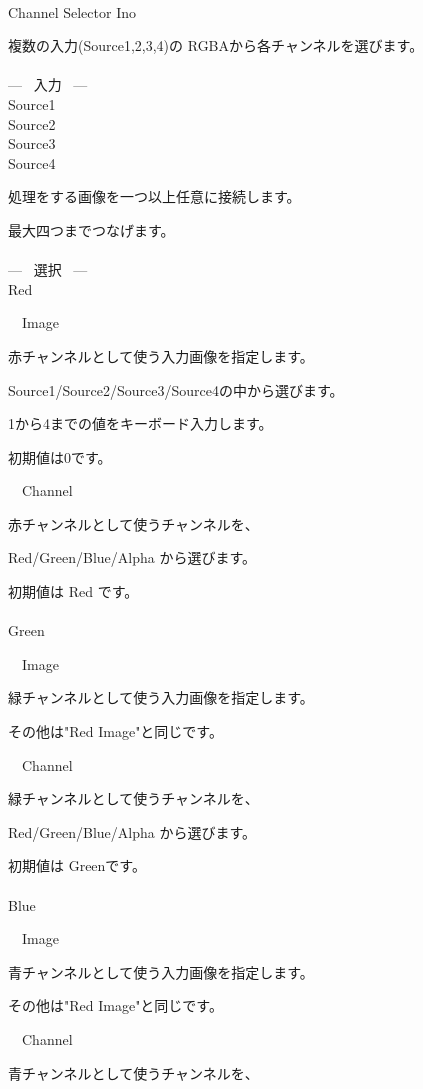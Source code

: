 \documentclass[a4paper,12pt]{article}
\begin{document}
\thispagestyle{empty}

\Large
\noindent \\
Channel Selector Ino\medskip
\par
\normalsize
複数の入力(Source1,2,3,4)の RGBAから各チャンネルを選びます。\\
\\
--- \ 入力 \ ---\\
Source1\\
Source2\\
Source3\\
Source4\par
処理をする画像を一つ以上任意に接続します。\par
最大四つまでつなげます。\\
\\
--- \ 選択 \ ---\\
Red\par
\noindent \ \, Image\par
赤チャンネルとして使う入力画像を指定します。\par
Source1/Source2/Source3/Source4の中から選びます。\par
1から4までの値をキーボード入力します。\par
初期値は0です。\\
\par
\noindent \ \, Channel\par
赤チャンネルとして使うチャンネルを、\par
Red/Green/Blue/Alpha から選びます。\par
初期値は Red です。\\
\\
Green\par
\noindent \ \, Image\par
緑チャンネルとして使う入力画像を指定します。\par
その他は"Red Image"と同じです。\\
\par
\noindent \ \, Channel\par
緑チャンネルとして使うチャンネルを、\par
Red/Green/Blue/Alpha から選びます。\par
初期値は Greenです。\\
\\
Blue\par
\noindent \ \, Image\par
青チャンネルとして使う入力画像を指定します。\par
その他は"Red Image"と同じです。\\
\par
\noindent \ \, Channel\par
青チャンネルとして使うチャンネルを、
\end{document}
